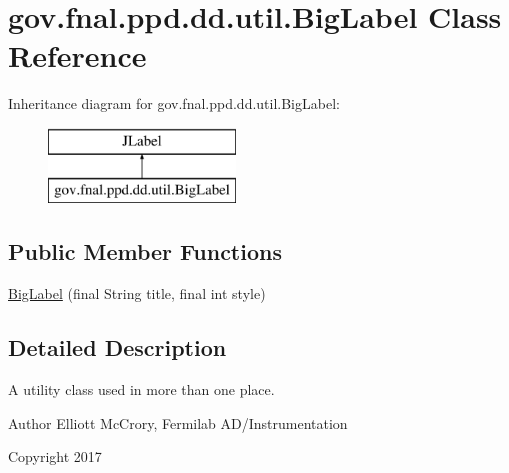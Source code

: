 \hypertarget{classgov_1_1fnal_1_1ppd_1_1dd_1_1util_1_1BigLabel}{\section{gov.\-fnal.\-ppd.\-dd.\-util.\-Big\-Label Class Reference}
\label{classgov_1_1fnal_1_1ppd_1_1dd_1_1util_1_1BigLabel}
}
Inheritance diagram for gov.\-fnal.\-ppd.\-dd.\-util.\-Big\-Label\-:\begin{figure}[H]
\begin{center}
\leavevmode
\includegraphics[height=2.000000cm]{classgov_1_1fnal_1_1ppd_1_1dd_1_1util_1_1BigLabel}
\end{center}
\end{figure}
\subsection*{Public Member Functions}
\begin{DoxyCompactItemize}
\item 
\hyperlink{classgov_1_1fnal_1_1ppd_1_1dd_1_1util_1_1BigLabel_a325ac92799bf54125230e3cd672d8bc8}{Big\-Label} (final String title, final int style)
\end{DoxyCompactItemize}


\subsection{Detailed Description}
A utility class used in more than one place.

\begin{DoxyAuthor}{Author}
Elliott Mc\-Crory, Fermilab A\-D/\-Instrumentation 
\end{DoxyAuthor}
\begin{DoxyCopyright}{Copyright}
2017 
\end{DoxyCopyright}


